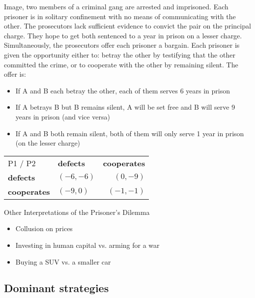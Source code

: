 \begin{example} \label{prisonersdilemma} 
	 Image, two members of a criminal gang are arrested and imprisoned. Each prisoner is in solitary confinement with no means of communicating with the other. The prosecutors lack sufficient evidence to convict the pair on the principal charge. They hope to get both sentenced to a year in prison on a lesser charge. Simultaneously, the prosecutors offer each prisoner a bargain. Each prisoner is given the opportunity either to: betray the other by testifying that the other committed the crime, or to cooperate with the other by remaining silent. The offer is:
	\begin{itemize}
		\item If A and B each betray the other, each of them serves 6 years in prison
		\item If A betrays B but B remains silent, A will be set free and B will serve 9 years in prison (and vice versa)
		\item If A and B both remain silent, both of them will only serve 1 year in prison (on the lesser charge)
	\end{itemize}
	
\begin{center}
	\begin{tabular}{|l|l|r|}
		\hline\hline
  			P1 / P2 & \textbf{defects} & \textbf{cooperates} \\
         		\cline{1-3}
   			\textbf{defects} & $(-6, -6)$ & $(0, -9)$ 	\arrayrulewidth2pt \\
            	\cline{1-3}
   			\textbf{cooperates} & $(-9, 0)$ & $(-1, -1)$ \\ \hline\hline
	\end{tabular}	
\end{center}


	Other Interpretations of the Prisoner's Dilemma
	\begin{itemize}
		\item Collusion on prices
		\item Investing in human capital vs. arming for a war
		\item Buying a SUV vs. a smaller car
	\end{itemize}
\end{example}


\subsection{Dominant strategies}

